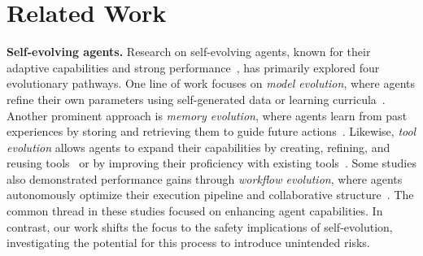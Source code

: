 \documentclass{article} %
\begin{document}
\section{Related Work}
\textbf{Self-evolving agents.} Research on self-evolving agents, known for their adaptive capabilities and strong performance~\citep{novikov2025alphaevolve,gao2025survey,fang2025comprehensive,liu2025advances}, has primarily explored four evolutionary pathways.
One line of work focuses on \textit{model evolution}, where agents refine their own parameters using self-generated data or learning curricula~\citep{zhao2025absolute, huang2025r, sun2025seagent, zhou2025self}.
Another prominent approach is \textit{memory evolution}, where agents learn from past experiences by storing and retrieving them to guide future actions~\citep{yang2025agentnet, lin2025se, zhou2025mementofinetuningllmagents}.
Likewise, \textit{tool evolution} allows agents to expand their capabilities by creating, refining, and reusing tools~\citep{qiu2025alita, haque2025advanced, zhao2025pyvision, zheng2025skillweaver} or by improving their proficiency with existing tools~\citep{qu2024exploration}.
Some studies also demonstrated performance gains through \textit{workflow evolution}, where agents autonomously optimize their execution pipeline and collaborative structure~\citep{hu2025automated, zhang2025aflow, wang2025evoagentx}.
The common thread in these studies focused on enhancing agent capabilities. In contrast, our work shifts the focus to the safety implications of self-evolution, investigating the potential for this process to introduce unintended risks.
\end{document}
